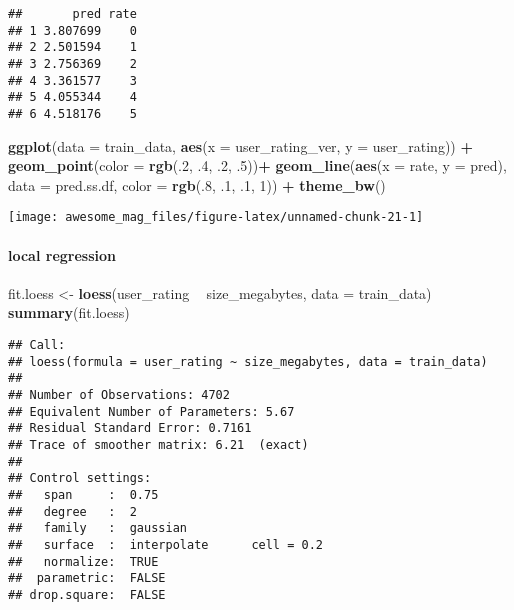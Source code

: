 \documentclass[]{article}
\newenvironment{Shaded}{\begin{snugshade}}{\end{snugshade}}
\newcommand{\KeywordTok}[1]{\textcolor[rgb]{0.13,0.29,0.53}{\textbf{#1}}}
\newcommand{\DataTypeTok}[1]{\textcolor[rgb]{0.13,0.29,0.53}{#1}}
\newcommand{\DecValTok}[1]{\textcolor[rgb]{0.00,0.00,0.81}{#1}}
\newcommand{\StringTok}[1]{\textcolor[rgb]{0.31,0.60,0.02}{#1}}
\newcommand{\OperatorTok}[1]{\textcolor[rgb]{0.81,0.36,0.00}{\textbf{#1}}}
\newcommand{\NormalTok}[1]{#1}
\let\oldparagraph\paragraph
\renewcommand{\paragraph}[1]{\oldparagraph{#1}\mbox{}}
\begin{document}
\begin{verbatim}
##       pred rate
## 1 3.807699    0
## 2 2.501594    1
## 3 2.756369    2
## 4 3.361577    3
## 5 4.055344    4
## 6 4.518176    5
\end{verbatim}

\begin{Shaded}
\begin{Highlighting}[]
\KeywordTok{ggplot}\NormalTok{(}\DataTypeTok{data =}\NormalTok{ train_data, }\KeywordTok{aes}\NormalTok{(}\DataTypeTok{x =}\NormalTok{ user_rating_ver, }\DataTypeTok{y =}\NormalTok{ user_rating)) }\OperatorTok{+}
\StringTok{     }\KeywordTok{geom_point}\NormalTok{(}\DataTypeTok{color =} \KeywordTok{rgb}\NormalTok{(.}\DecValTok{2}\NormalTok{, .}\DecValTok{4}\NormalTok{, .}\DecValTok{2}\NormalTok{, .}\DecValTok{5}\NormalTok{))}\OperatorTok{+}
\KeywordTok{geom_line}\NormalTok{(}\KeywordTok{aes}\NormalTok{(}\DataTypeTok{x =}\NormalTok{ rate, }\DataTypeTok{y =}\NormalTok{ pred), }\DataTypeTok{data =}\NormalTok{ pred.ss.df,}
          \DataTypeTok{color =} \KeywordTok{rgb}\NormalTok{(.}\DecValTok{8}\NormalTok{, .}\DecValTok{1}\NormalTok{, .}\DecValTok{1}\NormalTok{, }\DecValTok{1}\NormalTok{)) }\OperatorTok{+}\StringTok{ }\KeywordTok{theme_bw}\NormalTok{()}
\end{Highlighting}
\end{Shaded}

\texttt{[image: awesome\_mag\_files/figure-latex/unnamed-chunk-21-1]}

\paragraph{local regression}\label{local-regression}

\begin{Shaded}
\begin{Highlighting}[]
\NormalTok{fit.loess <-}\StringTok{ }\KeywordTok{loess}\NormalTok{(user_rating }\OperatorTok{~}\StringTok{ }\NormalTok{size_megabytes, }\DataTypeTok{data =}\NormalTok{ train_data)}
\KeywordTok{summary}\NormalTok{(fit.loess)}
\end{Highlighting}
\end{Shaded}

\begin{verbatim}
## Call:
## loess(formula = user_rating ~ size_megabytes, data = train_data)
## 
## Number of Observations: 4702 
## Equivalent Number of Parameters: 5.67 
## Residual Standard Error: 0.7161 
## Trace of smoother matrix: 6.21  (exact)
## 
## Control settings:
##   span     :  0.75 
##   degree   :  2 
##   family   :  gaussian
##   surface  :  interpolate      cell = 0.2
##   normalize:  TRUE
##  parametric:  FALSE
## drop.square:  FALSE
\end{verbatim}
\end{document}
